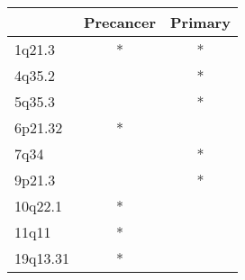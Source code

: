 \begin{tabular}{lcc}
\toprule
{} & Precancer & Primary \\
\midrule
1q21.3   &         * &       * \\
4q35.2   &           &       * \\
5q35.3   &           &       * \\
6p21.32  &         * &         \\
7q34     &           &       * \\
9p21.3   &           &       * \\
10q22.1  &         * &         \\
11q11    &         * &         \\
19q13.31 &         * &         \\
\bottomrule
\end{tabular}
